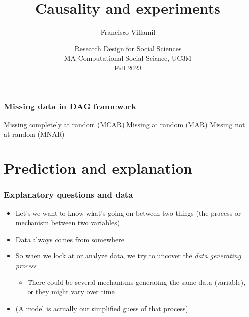 \documentclass[aspectratio=43]{beamer}
\title[Lecture 3: Causality and experiments]{\Large Causality and experiments}
\author[]{Francisco Villamil}
\date[]{Research Design for Social Sciences\\MA Computational Social Science, UC3M\\Fall 2023}
\begin{document}

\begin{frame}
  \titlepage
\end{frame}

\begin{frame}
\frametitle{Missing data in DAG framework}
\centering

Missing completely at random (MCAR)
Missing at random (MAR)
Missing not at random (MNAR)

\end{frame}

\section{Prediction and explanation}

\begin{frame}
\frametitle{Explanatory questions and data}
\centering

\begin{itemize}
  \item Let's we want to know what's going on between two things (the process or mechanism between two variables)
  \item Data always comes from somewhere
  \item So when we look at or analyze data, we try to uncover the \textit{data generating process}
  \begin{itemize}
    \item There could be several mechanisms generating the same data (variable), or they might vary over time
  \end{itemize}
  \item (A model is actually our simplified guess of that process)
\end{itemize}

\end{frame}
\end{document}
